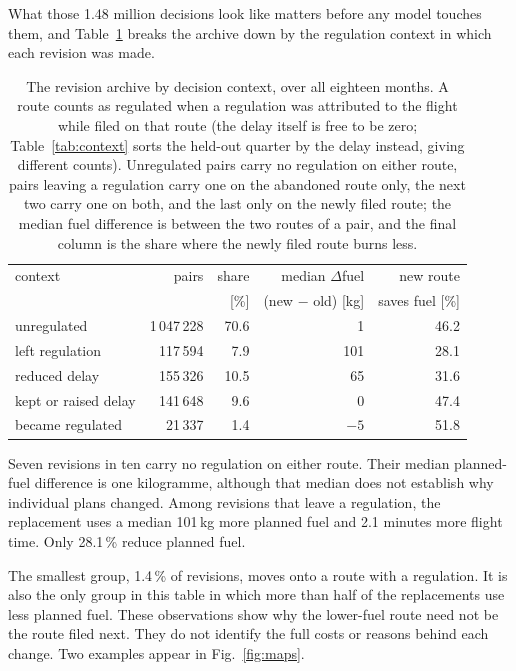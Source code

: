 \documentclass[preprint,authoryear,12pt]{elsarticle}
\begin{document}
What those 1.48 million decisions look like matters before any model
touches them, and Table~\ref{tab:composition} breaks the archive down
by the regulation context in which each revision was made.

\begin{table}[t]
\caption{The revision archive by decision context, over all eighteen
months. A route counts as regulated when a regulation was attributed to
the flight while filed on that route (the delay itself is free to be
zero; Table~\ref{tab:context} sorts the held-out quarter by the delay
instead, giving different counts). Unregulated pairs carry no
regulation on either route, pairs leaving a regulation carry one on the abandoned route
only, the next two carry one on both, and the last only on the newly
filed route; the median fuel difference is between the two routes of
a pair, and the final column is the share where the newly filed route
burns less.}
\label{tab:composition}
\centering\small
\begin{tabular}{lrrrr}
\toprule
context & pairs & share & median $\Delta$fuel & new route \\
        &       & [\%]  & (new $-$ old) [kg]  & saves fuel [\%] \\
\midrule
unregulated    & 1\,047\,228 & 70.6 & 1   & 46.2 \\
left regulation & 117\,594  & 7.9  & 101 & 28.1 \\
reduced delay  & 155\,326 & 10.5 & 65  & 31.6 \\
kept or raised delay & 141\,648 & 9.6 & 0 & 47.4 \\
became regulated & 21\,337  & 1.4  & $-5$ & 51.8 \\
\bottomrule
\end{tabular}
\end{table}

Seven revisions in ten carry no regulation on either route. Their median
planned-fuel difference is one kilogramme, although that median does not
establish why individual plans changed. Among revisions that leave a
regulation, the replacement uses a median 101\,kg more planned fuel and
2.1 minutes more flight time. Only 28.1\,\% reduce planned fuel.

The smallest group, 1.4\,\% of revisions, moves onto a route with a
regulation. It is also the only group in this table in which more than
half of the replacements use less planned fuel. These observations
show why the lower-fuel route need not be the route filed next. They do
not identify the full costs or reasons behind each change.
Two examples appear in Fig.~\ref{fig:maps}.
\end{document}
